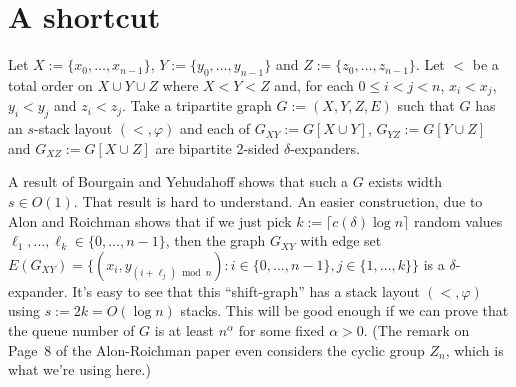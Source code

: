 \documentclass{patmorin}
\begin{document}
%
%
%
%
%
%
%

\section{A shortcut}

Let $X:=\{x_0,\ldots,x_{n-1}\}$, $Y:=\{y_0,\ldots,y_{n-1}\}$ and $Z:=\{z_0,\ldots,z_{n-1}\}$.  Let $<$ be a total order on $X\cup Y\cup Z$ where $X<Y<Z$ and, for each $0\le i<j< n$, $x_i<x_j$, $y_i<y_j$ and $z_i<z_j$.
Take a tripartite graph $G:=(X,Y,Z,E)$ such that $G$ has an $s$-stack layout $(<,\varphi)$ and each of $G_{XY}:=G[X\cup Y]$, $G_{YZ}:=G[Y\cup Z]$ and $G_{XZ}:=G[X\cup Z]$ are bipartite 2-sided $\delta$-expanders.

A result of Bourgain and Yehudahoff shows that such a $G$ exists width $s\in O(1)$.  That result is hard to understand. An easier construction, due to Alon and Roichman shows that if we just pick $k:=\lceil c(\delta)\log n\rceil$ random values $\ell_1,\ldots,\ell_k\in\{0,\ldots,n-1\}$, then the graph $G_{XY}$ with edge set $E(G_{XY})=\{(x_i,y_{(i+\ell_j)\bmod n}):i\in\{0,\ldots,n-1\},j\in\{1,\ldots,k\}\}$ is a $\delta$-expander.  It's easy to see that this ``shift-graph'' has a stack layout $(<,\varphi)$ using $s:=2k= O(\log n)$ stacks.  This will be good enough if we can prove that the queue number of $G$ is at least $n^\alpha$ for some fixed $\alpha>0$.  (The remark on Page~8 of the Alon-Roichman paper even considers the cyclic group $Z_n$, which is what we're using here.)
\end{document}
